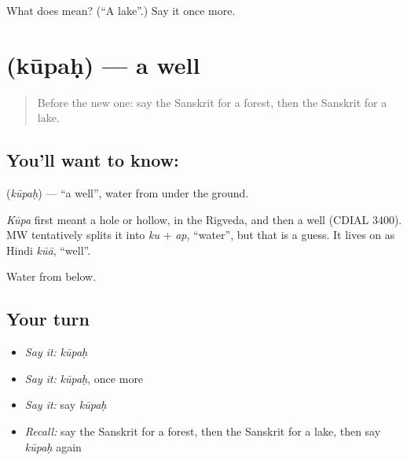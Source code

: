 \begin{tcolorbox}[breakable,colback=teal!4,colframe=teal!35!black,title={Before you move on}]
What does  mean? (\textquotedblleft{}A lake\textquotedblright{}.) Say it once more.
\end{tcolorbox}
\section[\texorpdfstring{\sk{कूपः} (kūpaḥ)}{कूपः (kūpaḥ)}]{ (kūpaḥ) — a well}

\label{lesson:SA-C82-well}



\begin{quote}
Before the new one: say the Sanskrit for a forest, then the Sanskrit for a lake.
\end{quote}

\subsection*{You'll want to know: }
\textbf{} (\emph{kūpaḥ}) — \textquotedblleft{}a well\textquotedblright{}, water from under the ground.

\begin{cousinweb}
\emph{Kūpa} first meant a hole or hollow, in the Rigveda, and then a well (CDIAL 3400). MW tentatively splits it into \emph{ku} + \emph{ap}, \textquotedblleft{}water\textquotedblright{}, but that is a guess. It lives on as Hindi \emph{kūā}, \textquotedblleft{}well\textquotedblright{}.
\end{cousinweb}

\begin{grammarlens}[title={What you've built}]
Water from below.
\end{grammarlens}

\subsection*{Your turn}
\begin{itemize}
\raggedright
  \item \emph{Say it:} \emph{kūpaḥ}
  \item \emph{Say it:} \emph{kūpaḥ}, once more
  \item \emph{Say it:} say \emph{kūpaḥ}
  \item \emph{Recall:} say the Sanskrit for a forest, then the Sanskrit for a lake, then say \emph{kūpaḥ} again
\end{itemize}

